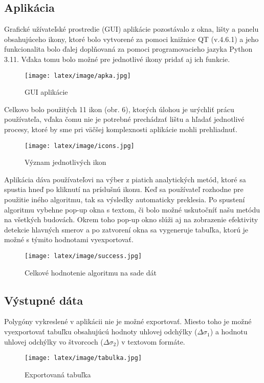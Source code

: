 \documentclass[12pt]{article}
\begin{document}
\subsection*{Aplikácia}
Grafické užívateľské prostredie (GUI) aplikácie  pozostávalo z okna, lišty a panelu obsahujúceho ikony, ktoré bolo vytvorené za pomoci knižnice QT (v.4.6.1) a jeho funkcionalita bolo ďalej doplňovaná za pomoci programovacieho jazyka Python 3.11. Vďaka tomu bolo možné pre jednotlivé ikony pridať aj ich funkcie.

\begin{figure} [h]
    \centering
    \texttt{[image: latex/image/apka.jpg]}
    \caption{GUI aplikácie}
    \label{fig:enter-label}
\end{figure}
Celkovo bolo použitých 11 ikon (obr. 6), ktorých úlohou je urýchliť prácu používateľa, 
vďaka čomu nie je potrebné prechádzať lištu a hľadať jednotlivé procesy, ktoré by sme pri 
väčšej komplexnosti aplikácie mohli prehliadnuť. \\

\begin{figure}[h]
    \centering
    \texttt{[image: latex/image/icons.jpg]}
    \caption{Význam jednotlivých ikon}
    \label{fig:enter-label}
\end{figure}
Aplikácia dáva používateľovi na výber z piatich analytických metód, ktoré sa spustia 
hneď po kliknutí na príslušnú ikonu. Keď sa používateľ rozhodne pre použitie iného algoritmu, tak sa výsledky automaticky preklesia. Po spustení algoritmu vybehne  pop-up okna s textom, či bolo možné uskutočníť našu metódu na všetkých budovách. Okrem toho pop-up okno slúži aj na zobrazenie efektivity detekcie hlavných smerov a po zatvorení okna sa vygeneruje tabuľka, ktorú je možné s týmito hodnotami vyexportovať.  


\begin{figure}[h]
    \centering
    \texttt{[image: latex/image/success.jpg]}
    \caption{Celkové hodnotenie algoritmu na sade dát}
    \label{fig:enter-label}
\end{figure}

\subsection*{Výstupné dáta}
Polygóny vykreslené v aplikácii nie je možné exportovať. Miesto toho je možné vyexportovať tabuľku obsahujúcú hodnoty uhlovej odchýlky ($\Delta\sigma_{1}$) a hodnotu uhlovej odchýlky vo štvorcoch ($\Delta\sigma_{2}$) v textovom formáte. 
\begin{figure}[h]
    \centering
    \texttt{[image: latex/image/tabulka.jpg]}
    \caption{Exportovaná tabuľka}
    \label{fig:enter-label}
\end{figure}
\newpage
\end{document}

